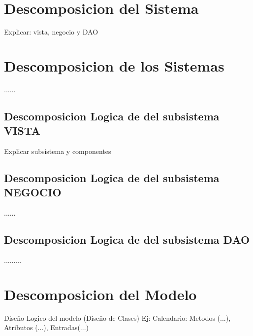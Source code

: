 \section{Descomposicion del Sistema}

Explicar: vista, negocio y DAO

\section{Descomposicion de los Sistemas}

......

\subsection{Descomposicion Logica de del subsistema VISTA}

Explicar subsistema y componentes


\subsection{Descomposicion Logica de del subsistema NEGOCIO}

......

\subsection{Descomposicion Logica de del subsistema DAO}

.........

\section{Descomposicion del Modelo}

Diseño Logico del modelo (Diseño de Clases)
Ej: Calendario: Metodos (...), Atributos (...), Entradas(...)
